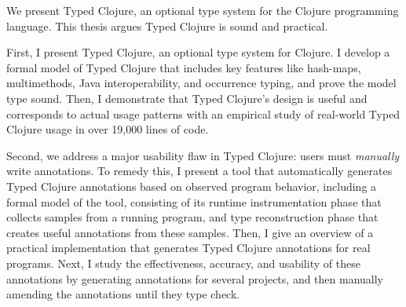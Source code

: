 We present Typed Clojure, an optional type system for the Clojure programming language.
This thesis argues Typed Clojure is sound and practical.

First, I present Typed Clojure, an optional type system for Clojure.
I develop a formal model of Typed Clojure that includes
key features like hash-maps, multimethods, Java interoperability, and occurrence typing,
and prove the model type sound.
Then, I demonstrate that Typed Clojure's design is useful and corresponds to actual usage patterns
with an empirical study of real-world Typed Clojure usage in over 19,000 lines of code.

Second, we address a major usability flaw in Typed Clojure: users must \emph{manually}
write annotations.
To remedy this, 
I present a tool that automatically generates Typed Clojure annotations based on observed
program behavior, including
a formal model of the tool, consisting of its runtime instrumentation phase that
collects samples from a running program, and type reconstruction phase
that creates useful annotations from these samples.
Then, I give an overview of a practical implementation that generates Typed Clojure annotations for
real programs.
Next, I study the effectiveness, accuracy, and usability of these annotations
by generating annotations for several projects, and then manually amending the annotations
until they type check.


